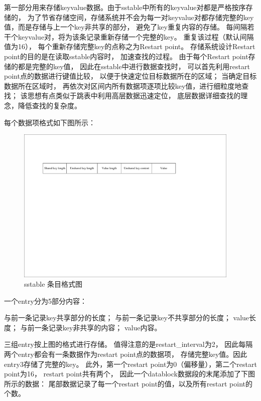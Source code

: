 \begin{enumerate}
\begin{enumerate}
					第一部分用来存储keyvalue数据。由于sstable中所有的keyvalue对都是严格按序存储的，
					为了节省存储空间，存储系统并不会为每一对keyvalue对都存储完整的key值，而是存储与上一个key非共享的部分，
					避免了key重复内容的存储。
					每间隔若干个keyvalue对，将为该条记录重新存储一个完整的key。
					重复该过程（默认间隔值为16），
					每个重新存储完整key的点称之为Restart point。
					存储系统设计Restart point的目的是在读取sstable内容时，
					加速查找的过程。
					由于每个Restart point存储的都是完整的key值，
					因此在sstable中进行数据查找时，
					可以首先利用restart point点的数据进行键值比较，
					以便于快速定位目标数据所在的区域；
					当确定目标数据所在区域时，
					再依次对区间内所有数据项逐项比较key值，进行细粒度地查找；
					该思想有点类似于跳表中利用高层数据迅速定位，
					底层数据详细查找的理念，降低查找的复杂度。
	
					
					每个数据项格式如下图所示：
	
					\begin{figure}[H]
						\centering
						\includegraphics[width=0.95\textwidth]{pdf/entry_format.pdf}
						\caption{sstable 条目格式图}
						\label{sstable_entry_format}
					\end{figure}
	
					一个entry分为5部分内容：
	
	与前一条记录key共享部分的长度；
	与前一条记录key不共享部分的长度；
	value长度；
	与前一条记录key非共享的内容；
	value内容。
	
	
	
	三组entry按上图的格式进行存储。
	值得注意的是restart\_interval为2，
	因此每隔两个entry都会有一条数据作为restart point点的数据项，
	存储完整key值。因此entry3存储了完整的key。
	此外，第一个restart point为0（偏移量），第二个restart point为16，
	restart point共有两个，
	因此一个datablock数据段的末尾添加了下图所示的数据：
	尾部数据记录了每一个restart point的值，以及所有restart point的个数。
	

\end{enumerate}
\end{enumerate}
